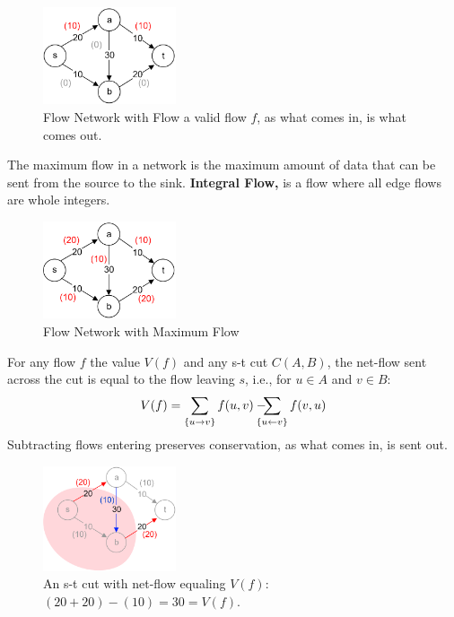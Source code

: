 \vspace{-1em}
\begin{figure}[h]
    \centering
    \includegraphics[width=0.35\textwidth]{Sections/net/flow.png}
    \caption{Flow Network with Flow a valid flow $f$, as what comes in, is what comes out.}
\end{figure}
\begin{Def}

    The maximum flow in a network is the maximum amount of data that can be sent from the source to the sink.
    \textbf{Integral Flow,} is a flow where all edge flows are whole integers.
\end{Def}

\begin{figure}[h]
    \centering
    \includegraphics[width=0.35\textwidth]{Sections/net/max.png}
    \caption{Flow Network with Maximum Flow}
\end{figure}

\newpage
\begin{Def}

    For any flow $f$ the value $V(f)$ and any s-t cut $C(A,B)$, the net-flow sent across the cut is equal to the flow leaving $s$, i.e.,
    for $u \in A$ and $v \in B$:
    \begin{equation}
        V(f) = \sum_{\{u\to v\}} f(u,v) - \hspace{-1em} \sum_{\{u\leftarrow v\}} f(v,u)
    \end{equation}
    Subtracting flows entering preserves conservation, as what comes in, is sent out.
\end{Def}

\begin{figure}[h]
    \centering
    \includegraphics[width=0.35\textwidth]{Sections/net/flowval.png}
    \caption{An s-t cut with net-flow equaling $V(f)$: $(20+20)-(10) = 30 = V(f)$.}
\end{figure}

